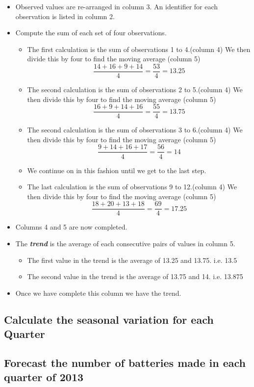 \documentclass[12pts]{article}
\begin{document}
\begin{itemize}
\item Observed values are re-arranged in column 3. An identifier for each observation is listed in column 2.
\item Compute the sum of each set of four observations.
\begin{itemize}
\item The first calculation is the sum of observations 1 to 4.(column 4) We then divide this by four to find the moving average (column 5)
\[\frac{14 + 16 + 9 + 14}{ 4} = \frac{53}{4} = 13.25 \]
\item The second calculation is the sum of observations 2 to 5.(column 4) We then divide this by four to find the moving average (column 5)
\[\frac{ 16 + 9 + 14 + 16}{ 4} = \frac{55}{4} = 13.75 \]
\item The second calculation is the sum of observations 3 to 6.(column 4) We then divide this by four to find the moving average (column 5)
\[\frac{9 + 14 + 16 + 17}{ 4} = \frac{56}{4} = 14 \]
\item We continue on in this fashion until we get to the last step.
\item The last calculation is the sum of observations 9 to 12.(column 4) We then divide this by four to find the moving average (column 5)
\[\frac{ 18 + 20 + 13 + 18}{ 4} = \frac{69}{4} = 17.25 \]
\end{itemize}
\item Columns 4 and 5 are now completed. 
\item The \textbf{\textit{trend}} is the average of each consecutive pairs of values in column 5. 
\begin{itemize}
\item The first value in the trend is the average of 13.25 and 13.75. i.e. 13.5
\item The second value in the trend is the average of 13.75 and 14. i.e. 13.875
\end{itemize}
\item Once we have complete this column we have the trend.
\end{itemize}
\subsection*{Calculate the seasonal variation for each Quarter}
\subsection*{Forecast the number of batteries made in each quarter of 2013}
\end{document}
